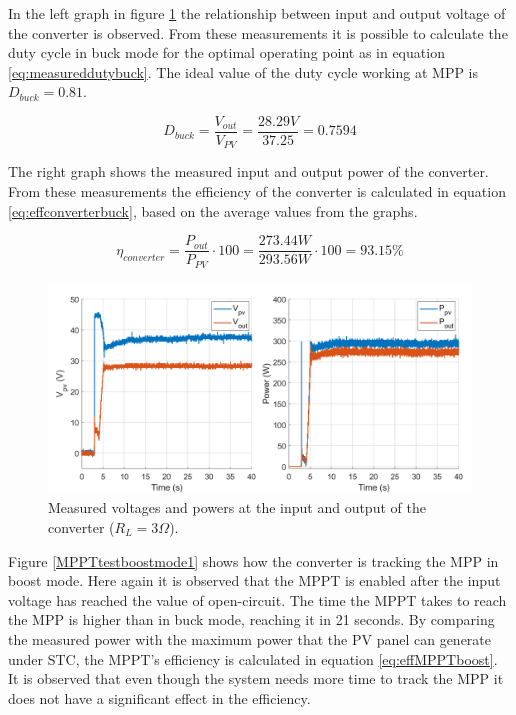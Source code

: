 In the left graph in figure \ref{MPPTtestbuckmode2} the relationship between input and output voltage of the converter is observed. From these measurements it is possible to calculate the duty cycle in buck mode for the optimal operating point as in equation \ref{eq:measureddutybuck}. The ideal value of the duty cycle working at MPP is $D_{buck} = 0.81$.

\begin{equation} \label{eq:measureddutybuck}
D_{buck}= \dfrac{V_{out}}{V_{PV}} = \dfrac{28.29V}{37.25} = 0.7594
\end{equation}

The right graph shows the measured input and output power of the converter. From these measurements the efficiency of the converter is calculated in equation \ref{eq:effconverterbuck}, based on the average values from the graphs.

\begin{equation} \label{eq:effconverterbuck}
\eta_{converter}= \dfrac{P_{out}}{P_{PV}} \cdot 100 = \dfrac{273.44W}{293.56W} \cdot 100 = 93.15\% 
\end{equation}


\begin{figure}[H]
	\begin{center}
		\includegraphics[width=1\textwidth]{../Pictures/P1/Test/Buck_mode_MPPT_Vin_Vout_Pin_Pout}
		\caption{Measured voltages and powers at the input and output of the converter ($R_{L}=3\Omega$).}
		\label{MPPTtestbuckmode2}
	\end{center}	
\end{figure}

Figure \ref{MPPTtestboostmode1} shows how the converter is tracking the MPP in boost mode. Here again it is observed that the MPPT is enabled after the input voltage has reached the value of open-circuit. The time the MPPT takes to reach the MPP is higher than in buck mode, reaching it in 21 seconds. By comparing the measured power with the maximum power that the PV panel can generate under STC, the MPPT's efficiency is calculated in equation \ref{eq:effMPPTboost}. It is observed that even though the system needs more time to track the MPP it does not have a significant effect in the efficiency.

